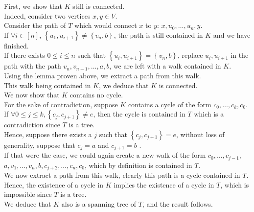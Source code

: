 \documentclass[11pt, a4paper]{article}
\begin{document}
First, we show that $K$ still is connected.\\
Indeed, consider two vertices $x,y \in V$.\\
Consider the path of $T$ which would connect $x$ to $y$: $x, u_0,\ldots, u_n, y$.\\
If $\forall i \in [ n] $, $ \left\{ u_1, u_{i+1}  \right\} \neq \left\{ v_n,b \right\} $, the path is still contained in $K$ and we have finished.\\
If there exists $0 \leq i \leq n$ such that $ \left\{ u_i, u_{i+1}  \right\} = \left\{ v_n,b \right\}  $, replace $ u_i, u_{i+1} $ in the path with the path $v_n, v_{n-1} ,\ldots, a, b$, we are left with a walk contained in $K$.\\
Using the lemma proven above, we extract a path from this walk.\\
This walk being contained in $K$, we deduce that $K$ is connected.\\

We now show that $K$ contains no cycle.\\
For the sake of contradiction, suppose $K$ contains a cycle of the form $c_0, \ldots, c_k, c_0$.\\
If $\forall 0 \leq j \leq k, \left\{ c_j, c_{j+1}  \right\} \neq e$, then the cycle is contained in $T$ which is a contradiction since $T$ is a tree.\\
Hence, suppose there exists a $j$ such that $ \left\{ c_j, c_{j+1}  \right\} = e$, without loss of generality, suppose that $c_j =a$ and $c_{j+1} =b$	.\\
If that were the case, we could again create a new walk of the form $ c_0, \ldots, c_{j-1} ,$ $ a,v_1 ,  \ldots, v_n, b , c_{j+2} ,\ldots, c_n, c_0 $, which by definition is contained in $T$.\\
We now extract a path from this walk, clearly this path is a cycle contained in $T$.\\
Hence, the existence of a cycle in $K$ implies the existence of a cycle in $T$, which is impossible since $T$ is a tree.\\
\hr
We deduce that $K$ also is a spanning tree of $T$, and the result follows.
\end{document}
